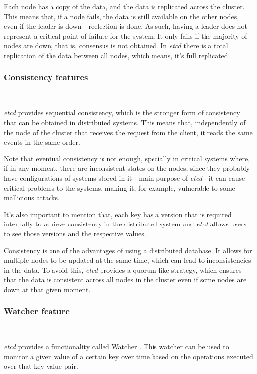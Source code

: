 \documentclass[screen,review]{acmart}
\begin{document}
Each node has a copy of the data, and the data is replicated across the cluster. This means that, if a node fails, the data is still available on the other nodes, even if the leader is down - reelection is done. As such, having a leader does not represent a critical point of failure for the system. It only fails if the majority of nodes are down, that is, consensus is not obtained.
In \textit{etcd} there is a total replication of the data between all nodes, which means, it's full replicated. \\

\subsubsection{Consistency features}~\

\textit{etcd} provides sequential consistency, which is the stronger form of consistency that can be obtained in distributed systems. This means that, independently of the node of the cluster that receives the request from the client, it reads the same events in the same order.

Note that eventual consistency is not enough, specially in critical systems where, if in any moment, there are inconsistent states on the nodes, since they probably have configurations of systems stored in it - main purpose of \textit{etcd} - it can cause critical problems to the systems, making it, for example, vulnerable to some mallicious attacks.

It's also important to mention that, each key has a version that is required internally to achieve consistency in the distributed system and \textit{etcd} allows users to see those versions and the respective values.

Consistency is one of the advantages of using a distributed database. It allows for multiple nodes to be updated at the same time, which can lead to inconsistencies in the data. To avoid this, \textit{etcd} provides a quorum like strategy, which ensures that the data is consistent across all nodes in the cluster even if some nodes are down at that given moment\cite{etcd_api}. \\

\subsubsection{Watcher feature}~\

\textit{etcd} provides a functionality called Watcher \cite{etcd_watcher}. This watcher can be used to monitor a given value of a certain key over time based on the operations executed over that key-value pair.
\end{document}
